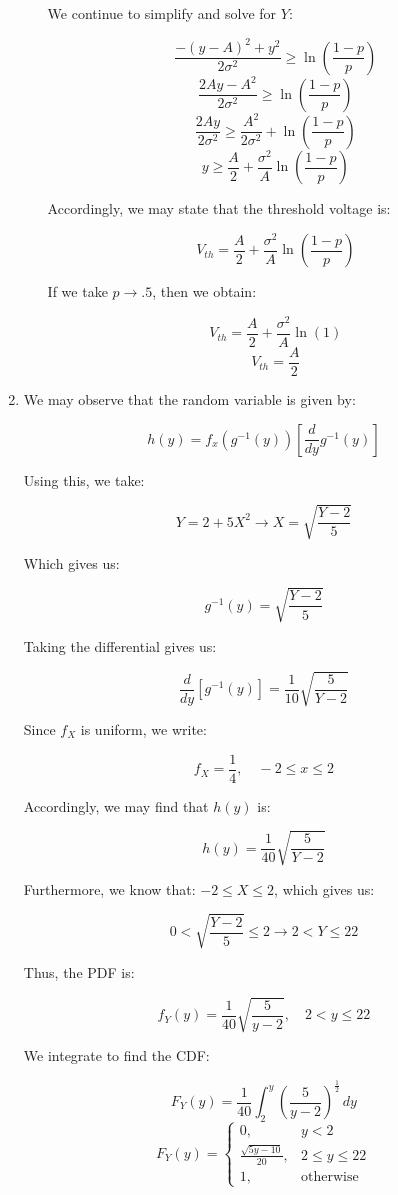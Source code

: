 \begin{enumerate}
\begin{enumerate}
        We continue to simplify and solve for $Y$:

        $$\frac{-(y-A)^2+y^2}{2\sigma^2}\geq \ln\left(\frac{1-p}{p}\right)$$
        $$\frac{2Ay-A^2}{2\sigma^2}\geq \ln\left(\frac{1-p}{p}\right)$$
        $$\frac{2Ay}{2\sigma^2}\geq \frac{A^2}{2\sigma^2}+\ln\left(\frac{1-p}{p}\right)$$
        $$y\geq \frac{A}{2}+\frac{\sigma^2}{A}\ln\left(\frac{1-p}{p}\right)$$

        Accordingly, we may state that the threshold voltage is:

        $$\boxed{V_{th}=\frac{A}{2}+\frac{\sigma^2}{A}\ln\left(\frac{1-p}{p}\right)}$$

        If we take $p\to.5$, then we obtain:

        $$V_{th}=\frac{A}{2}+\frac{\sigma^2}{A}\ln\left(1\right)$$
        $$\boxed{V_{th}=\frac{A}{2}}$$

    \end{enumerate}

  \item We may observe that the random variable is given by:

    $$h(y)=f_x(g^{-1}(y))\left[ \frac{d}{dy} g^{-1}(y) \right]$$

    Using this, we take:

    $$Y=2+5X^2\to X=\sqrt{\frac{Y-2}{5}}$$

    Which gives us:

    $$g^{-1}(y)=\sqrt{\frac{Y-2}{5}}$$

    Taking the differential gives us:

    $$\frac{d}{dy}[g^{-1}(y)]=\frac{1}{10}\sqrt{\frac{5}{Y-2}}$$

    Since $f_X$ is uniform, we write:

    $$f_X=\frac{1}{4},\quad -2\leq x\leq 2$$

    Accordingly, we may find that $h(y)$ is:

    $$h(y)=\frac{1}{40}\sqrt{\frac{5}{Y-2}}$$

    Furthermore, we know that: $-2\leq X\leq 2$, which gives us:

    $$0<\sqrt{\frac{Y-2}{5}}\leq 2\to 2< Y \leq22$$

    Thus, the PDF is:

    $$\boxed{f_Y(y)=\frac{1}{40}\sqrt{\frac{5}{y-2}},\quad 2<y\leq 22}$$

    We integrate to find the CDF:

    $$F_Y(y)=\frac{1}{40}\int_2^{y} \left( \frac{5}{y-2} \right)^{\frac{1}{2}}\,dy$$
    $$\boxed{F_Y(y)=\left\{\begin{array}{ll} 0, & y<2\\ \frac{\sqrt{5y-10}}{20}, & 2\leq y\leq 22\\ 1, & \text{otherwise}\end{array}}$$


\end{enumerate}
